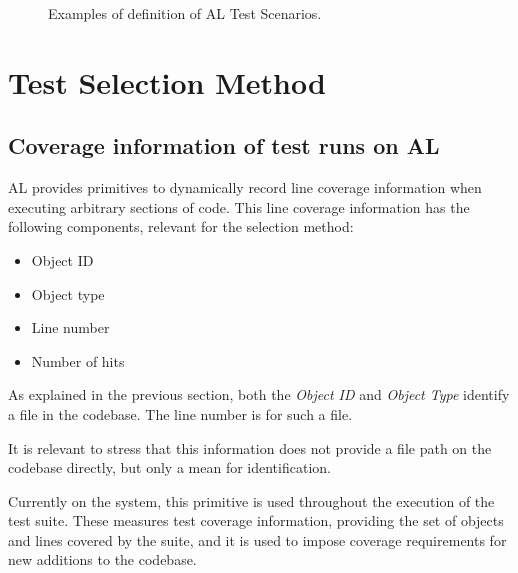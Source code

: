\documentclass{article}
\begin{document}
\begin{figure}[H]
  \centering
  \qquad
  \caption{Examples of definition of AL Test Scenarios. }
  \label{fig:al-test-examples}
\end{figure}


\section{Test Selection Method}
\subsection{Coverage information of test runs on AL}\label{section:cov-info}
AL provides primitives to dynamically record line coverage information when executing arbitrary sections of code. This line coverage information has the following components, relevant for the selection method:
\begin{itemize}
\item Object ID
\item Object type
\item Line number
\item Number of hits
\end{itemize}

As explained in the previous section, both the \emph{Object ID} and \emph{Object Type} identify a file in the codebase. The line number is for such a file.

It is relevant to stress that this information does not provide a file path on the codebase directly, but only a mean for identification.

Currently on the system, this primitive is used throughout the execution of the test suite. These measures test coverage information, providing the set of objects and lines covered by the suite, and it is used to impose coverage requirements for new additions to the codebase.
\end{document}
